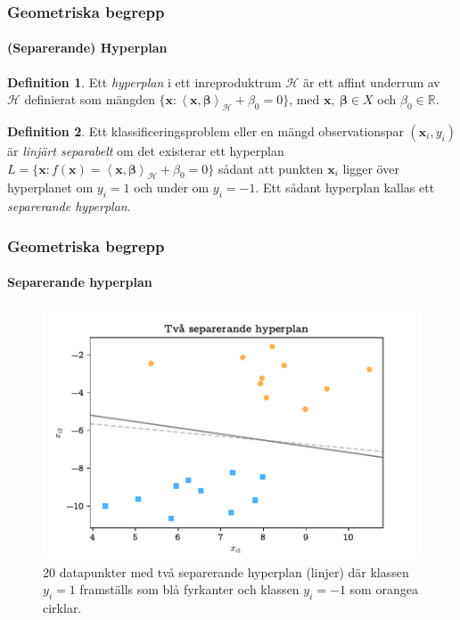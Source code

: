 \documentclass{beamer}
\theoremstyle{definition}
\newtheorem{defi}{Definition}[section]
\theoremstyle{remark}
\newcommand{\bfbeta}{{\boldsymbol{\beta}}}
\newcommand{\bfx}{\mathbf{x}}
\newcommand{\llangle}{\left\langle}
\newcommand{\rrangle}{\right\rangle}
\newcommand{\sephyp}{\{ \mathbf{x} : f\left(\mathbf{x}\right)=\inner{\bfx}{\bfbeta}_\mathcal{H} + \beta_0=0\}}
\newcommand{\inner}[2]{\llangle #1, #2 \rrangle}
\newcommand{\hil}{\mathcal{H}}
\begin{document}
\begin{frame}
\frametitle{Geometriska begrepp}
\framesubtitle{(Separerande) Hyperplan}
\begin{defi}
	Ett \textit{hyperplan} i ett inreproduktrum $\mathcal{H}$ är ett affint underrum av $\mathcal{H}$ definierat som mängden $\{\mathbf{x}: \inner{\bfx}{\bfbeta}_\mathcal{H} + \beta_0=0\}$, med $\mathbf{x},~\bfbeta\in X$ och $\beta_0\in\mathbb{R}$.
\end{defi}

\begin{defi}
	Ett klassificeringsproblem eller en mängd observationspar $\left(\mathbf{x}_i, y_i\right)$ är \textit{linjärt separabelt} om det existerar ett hyperplan $L=\sephyp$ sådant att punkten $\bfx_i$ ligger över hyperplanet om $y_i=1$ och under om $y_i=-1$. Ett sådant hyperplan kallas ett \emph{separerande hyperplan}.
\end{defi}


\end{frame}

\begin{frame}
\frametitle{Geometriska begrepp}
\framesubtitle{Separerande hyperplan}
\begin{figure}[h]
	\centering
	\includegraphics[width=0.8\linewidth, trim={0.5cm 2mm 0.5cm 6mm}, clip]{KandFigur1.pdf}
	\caption{\label{fig:separatinghyperplane}20 datapunkter med två separerande hyperplan (linjer) där klassen $y_i=1$ framställs som blå fyrkanter och klassen $y_i=-1$ som orangea cirklar.}
\end{figure}
\end{frame}
\end{document}
